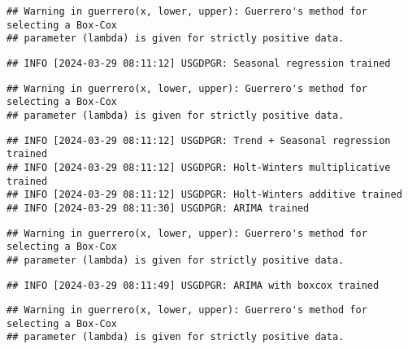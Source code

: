 \documentclass[
]{article}
\begin{document}
\begin{verbatim}
## Warning in guerrero(x, lower, upper): Guerrero's method for selecting a Box-Cox
## parameter (lambda) is given for strictly positive data.
\end{verbatim}

\begin{verbatim}
## INFO [2024-03-29 08:11:12] USGDPGR: Seasonal regression trained
\end{verbatim}

\begin{verbatim}
## Warning in guerrero(x, lower, upper): Guerrero's method for selecting a Box-Cox
## parameter (lambda) is given for strictly positive data.
\end{verbatim}

\begin{verbatim}
## INFO [2024-03-29 08:11:12] USGDPGR: Trend + Seasonal regression trained
## INFO [2024-03-29 08:11:12] USGDPGR: Holt-Winters multiplicative trained
## INFO [2024-03-29 08:11:12] USGDPGR: Holt-Winters additive trained
## INFO [2024-03-29 08:11:30] USGDPGR: ARIMA trained
\end{verbatim}

\begin{verbatim}
## Warning in guerrero(x, lower, upper): Guerrero's method for selecting a Box-Cox
## parameter (lambda) is given for strictly positive data.
\end{verbatim}

\begin{verbatim}
## INFO [2024-03-29 08:11:49] USGDPGR: ARIMA with boxcox trained
\end{verbatim}

\begin{verbatim}
## Warning in guerrero(x, lower, upper): Guerrero's method for selecting a Box-Cox
## parameter (lambda) is given for strictly positive data.
\end{verbatim}
\end{document}

